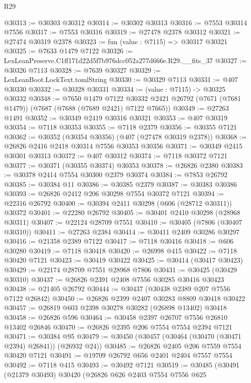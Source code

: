 \begin{lexlean}{R29}
\begin{coremodule}
@30313 := @30303 @30312
@30314 := @30302 @30313
@30316 := @7553 @30314 @7556
@30317 := @7553 @30316
@30319 := @27478 @2378 @30312
@30321 := @27474 @30319 @2378
@30323 := fun (value : @7115) => @30317 @30321
@30325 := @7633 @1479 @7122
@30326 := LexLeanPreserve.C1ff171d22d5f7b976dcc052a277d666e.R29.__fits_37
@30327 := @30326 @7113
@30328 := @7639 @30327
@30329 := LexLeanBoot.LockText.tomlString
@30330 := @30329 @7113
@30331 := @407 @30330
@30332 := @30328 @30331
@30334 := (value : @7115) -> @30325 @30332
@30348 := @7650
    @1479
    @7122
    @30332
    @2421
    @26792
    (@7671 (@7681 @1479))
    (@7687 (@7688 (@7689 @2421) @7122 @7665))
@30349 := @27263 @1491
@30352 := @30349 @2419 @30316 @30321
@30353 := @407 @30319
@30354 := @7118 @30353
@30355 := @7118 @2379
@30356 := @30355 @7121
@30362 := @30352 (@30354 @30356) (@407 (@27478 @30319 @2378))
@30368 := @26826 @2416 @2418 @30314 @7556 @30353 @30356
@30371 := @30349 @2415 @30301 @30313
@30372 := @407 @30312
@30374 := @7118 @30372 @7121
@30377 := @30371 (@30355 @30374) @30353
@30378 := @26826 @2380
@30383 := @30378 @2414 @7554 @30300 @2379 @30374
@30384 := @7853 @26792
@30385 := @30384 @11
@30386 := @30385 @2379
@30387 := @30383 @30386
@30393 := @26826 @2412 @206 @30298 @7554 @30372 @7121
@30394 := @22316 @26792
@30400 := @30394 @2411 @30298 (@606 (@28712 @30311)) @30372
@30401 := @22280 @26792
@30405 := @30401 @2410 @30298 (@28968 @30311)
@30407 := @22124 @28709 @7551
@30410 := @30405 (@7806 (@30407 @30310))
@30411 := @27263 @2384
@30414 := @30411 @2409 @30286 @30297
@30416 := @21358 @2389 @7122
@30417 := @7118 @30416
@30418 := @606 @30280
@30419 := @7118 @30418
@30420 := @26998 @415
@30422 := @7118 @30420 @7121
@30423 := @30419 @30422
@30425 := @30414 (@30417 @30423)
@30429 := @22174 @28709 @7551 @28968 @7806
@30431 := @30425 (@30429 @30310)
@30437 := @26826 @2391 @2408 @7556 @30285 @30416 @30423
@30438 := @21405 @26792
@30444 := @30437 (@30438 @2389 @207 @7556 @7122 @26842)
@30450 := @26826 @2399 @2407 @30283 @8809 @30418 @30422
@30457 := @26819 @603 @2398 @30278 @30282 (@26898 @13402) @30418
@30458 := @26826 @596
@30464 := @30458 @2397 @26707 @7556 @26810 @13402 @26846
@30470 := @26826 @2395 @206 @7554 @7554 @2394 @7121
@30471 := @30384 @95
@30479 := @30450 (@30457 (@30464 (@30470 (@30471 @2394) @26841)) (@26932 @24))
@30485 := @26826 @2405 @206 @7559 @7554 @30420 @7121
@30491 := @19709 @26792 @656 @2401 @2404 @7557 @7554
@30492 := @7118 @415
@30493 := @30492 @7121
@30519 := @30485
    (@30491
      (@21379 @30493)
      @30420
      (@26826
        @626
        @2403
        @7554
        @7556
        @625

\end{coremodule}
\end{lexlean}
